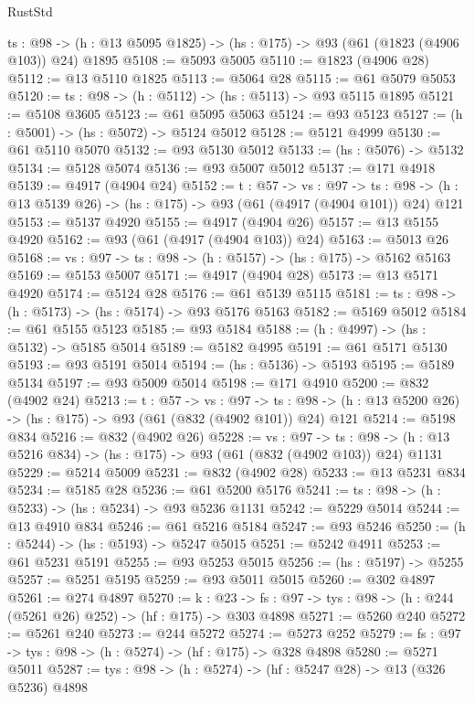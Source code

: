 \begin{lexlean}{RustStd}
\begin{coremodule}
  {ts : @98} -> (h : @13 @5095 @1825) -> (hs : @175) -> @93 (@61 (@1823 (@4906 @103)) @24) @1895
@5108 := @5093 @5005
@5110 := @1823 (@4906 @28)
@5112 := @13 @5110 @1825
@5113 := @5064 @28
@5115 := @61 @5079 @5053
@5120 := {ts : @98} -> (h : @5112) -> (hs : @5113) -> @93 @5115 @1895
@5121 := @5108 @3605
@5123 := @61 @5095 @5063
@5124 := @93 @5123
@5127 := (h : @5001) -> (hs : @5072) -> @5124 @5012
@5128 := @5121 @4999
@5130 := @61 @5110 @5070
@5132 := @93 @5130 @5012
@5133 := (hs : @5076) -> @5132
@5134 := @5128 @5074
@5136 := @93 @5007 @5012
@5137 := @171 @4918
@5139 := @4917 (@4904 @24)
@5152 := {t : @57} ->
  {vs : @97} ->
  {ts : @98} -> (h : @13 @5139 @26) -> (hs : @175) -> @93 (@61 (@4917 (@4904 @101)) @24) @121
@5153 := @5137 @4920
@5155 := @4917 (@4904 @26)
@5157 := @13 @5155 @4920
@5162 := @93 (@61 (@4917 (@4904 @103)) @24)
@5163 := @5013 @26
@5168 := {vs : @97} -> {ts : @98} -> (h : @5157) -> (hs : @175) -> @5162 @5163
@5169 := @5153 @5007
@5171 := @4917 (@4904 @28)
@5173 := @13 @5171 @4920
@5174 := @5124 @28
@5176 := @61 @5139 @5115
@5181 := {ts : @98} -> (h : @5173) -> (hs : @5174) -> @93 @5176 @5163
@5182 := @5169 @5012
@5184 := @61 @5155 @5123
@5185 := @93 @5184
@5188 := (h : @4997) -> (hs : @5132) -> @5185 @5014
@5189 := @5182 @4995
@5191 := @61 @5171 @5130
@5193 := @93 @5191 @5014
@5194 := (hs : @5136) -> @5193
@5195 := @5189 @5134
@5197 := @93 @5009 @5014
@5198 := @171 @4910
@5200 := @832 (@4902 @24)
@5213 := {t : @57} ->
  {vs : @97} ->
  {ts : @98} -> (h : @13 @5200 @26) -> (hs : @175) -> @93 (@61 (@832 (@4902 @101)) @24) @121
@5214 := @5198 @834
@5216 := @832 (@4902 @26)
@5228 := {vs : @97} ->
  {ts : @98} -> (h : @13 @5216 @834) -> (hs : @175) -> @93 (@61 (@832 (@4902 @103)) @24) @1131
@5229 := @5214 @5009
@5231 := @832 (@4902 @28)
@5233 := @13 @5231 @834
@5234 := @5185 @28
@5236 := @61 @5200 @5176
@5241 := {ts : @98} -> (h : @5233) -> (hs : @5234) -> @93 @5236 @1131
@5242 := @5229 @5014
@5244 := @13 @4910 @834
@5246 := @61 @5216 @5184
@5247 := @93 @5246
@5250 := (h : @5244) -> (hs : @5193) -> @5247 @5015
@5251 := @5242 @4911
@5253 := @61 @5231 @5191
@5255 := @93 @5253 @5015
@5256 := (hs : @5197) -> @5255
@5257 := @5251 @5195
@5259 := @93 @5011 @5015
@5260 := @302 @4897
@5261 := @274 @4897
@5270 := {k : @23} ->
  {fs : @97} -> {tys : @98} -> (h : @244 (@5261 @26) @252) -> (hf : @175) -> @303 @4898
@5271 := @5260 @240
@5272 := @5261 @240
@5273 := @244 @5272
@5274 := @5273 @252
@5279 := {fs : @97} -> {tys : @98} -> (h : @5274) -> (hf : @175) -> @328 @4898
@5280 := @5271 @5011
@5287 := {tys : @98} -> (h : @5274) -> (hf : @5247 @28) -> @13 (@326 @5236) @4898

\end{coremodule}
\end{lexlean}
